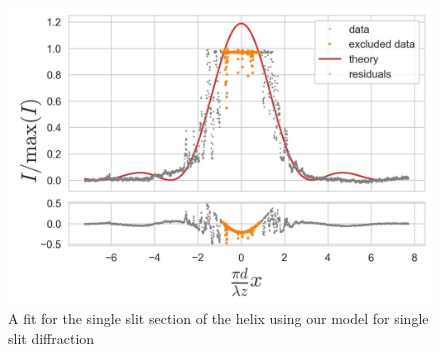 \begin{figure}[H]
    \includegraphics[width=0.9\columnwidth]{figures/Single slit section.jpeg}
    \caption{A fit for the single slit section of the helix using our model for single slit diffraction}
    \label{fig:Single slit section}
\end{figure}